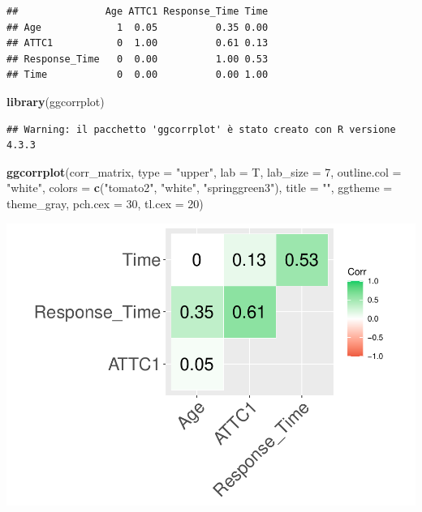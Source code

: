 \documentclass[
]{article}
\newenvironment{Shaded}{\begin{snugshade}}{\end{snugshade}}
\newcommand{\AttributeTok}[1]{\textcolor[rgb]{0.13,0.29,0.53}{#1}}
\newcommand{\DecValTok}[1]{\textcolor[rgb]{0.00,0.00,0.81}{#1}}
\newcommand{\FunctionTok}[1]{\textcolor[rgb]{0.13,0.29,0.53}{\textbf{#1}}}
\newcommand{\NormalTok}[1]{#1}
\newcommand{\StringTok}[1]{\textcolor[rgb]{0.31,0.60,0.02}{#1}}
\begin{document}
\begin{verbatim}
##               Age ATTC1 Response_Time Time
## Age             1  0.05          0.35 0.00
## ATTC1           0  1.00          0.61 0.13
## Response_Time   0  0.00          1.00 0.53
## Time            0  0.00          0.00 1.00
\end{verbatim}

\begin{Shaded}
\begin{Highlighting}[]
\FunctionTok{library}\NormalTok{(ggcorrplot)                                             }
\end{Highlighting}
\end{Shaded}

\begin{verbatim}
## Warning: il pacchetto 'ggcorrplot' è stato creato con R versione 4.3.3
\end{verbatim}

\begin{Shaded}
\begin{Highlighting}[]
\FunctionTok{ggcorrplot}\NormalTok{(corr\_matrix, }
           \AttributeTok{type =} \StringTok{"upper"}\NormalTok{, }
           \AttributeTok{lab =}\NormalTok{ T, }
           \AttributeTok{lab\_size =} \DecValTok{7}\NormalTok{, }
           \AttributeTok{outline.col =} \StringTok{"white"}\NormalTok{, }
           \AttributeTok{colors =} \FunctionTok{c}\NormalTok{(}\StringTok{"tomato2"}\NormalTok{, }\StringTok{"white"}\NormalTok{, }\StringTok{"springgreen3"}\NormalTok{), }
           \AttributeTok{title =} \StringTok{""}\NormalTok{, }
           \AttributeTok{ggtheme =}\NormalTok{ theme\_gray, }
           \AttributeTok{pch.cex =} \DecValTok{30}\NormalTok{, }
           \AttributeTok{tl.cex =} \DecValTok{20}\NormalTok{)}
\end{Highlighting}
\end{Shaded}

\includegraphics{Simulated_example_files/figure-latex/unnamed-chunk-15-1.pdf}
\end{document}
